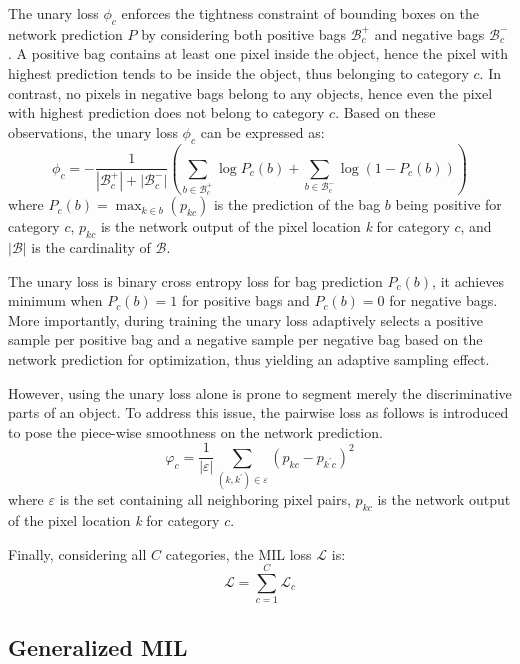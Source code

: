 \documentclass[runningheads]{llncs}
\begin{document}
The unary loss $\phi_c$ enforces the tightness constraint of bounding boxes on the network prediction $P$ by considering both positive bags $\mathcal{B}_c^+$ and negative bags $\mathcal{B}_c^-$. A positive bag contains at least one pixel inside the object, hence the pixel with highest prediction tends to be inside the object, thus belonging to category $c$. In contrast, no pixels in negative bags belong to any objects, hence even the pixel with highest prediction does not belong to category $c$. Based on these observations, the unary loss $\phi_c$ can be expressed as:
\begin{equation}
\phi_c = -\frac{1}{|\mathcal{B}_c^+|+|\mathcal{B}_c^-|} \left( \sum_{b \in \mathcal{B}_c^+} \log P_c(b) + \sum_{b \in \mathcal{B}_c^-} \log(1-P_c(b)) \right)
\label{equ:unary_loss}
\end{equation}
where $P_c(b) = \max_{k \in b}(p_{kc})$ is the prediction of the bag $b$ being positive for category $c$, $p_{kc}$ is the network output of the pixel location \textit{k} for category $c$, and $|\mathcal{B}|$ is the cardinality of $\mathcal{B}$. 

The unary loss is binary cross entropy loss for bag prediction $P_c(b)$, it achieves minimum when $P_c(b)=1$ for positive bags and $P_c(b)=0$ for negative bags. More importantly, during training the unary loss adaptively selects a positive sample per positive bag and a negative sample per negative bag based on the network prediction for optimization, thus yielding an adaptive sampling effect. 

However, using the unary loss alone is prone to segment merely the discriminative parts of an object. To address this issue, the pairwise loss as follows is introduced to pose the piece-wise smoothness on the network prediction.
\begin{equation}
\varphi_c = \frac{1}{|\varepsilon|} \sum_{(k,k^\prime) \in \varepsilon} \left( p_{kc} - p_{k^\prime c} \right) ^2
\end{equation}
where $\varepsilon$ is the set containing all neighboring pixel pairs, $p_{kc}$ is the network output of the pixel location \textit{k} for category $c$.

Finally, considering all $C$ categories, the MIL loss $\mathcal{L}$ is:
\begin{equation}
\mathcal{L} = \sum_{c=1}^C \mathcal{L}_c
\end{equation}


\subsection{Generalized MIL}
\end{document}
